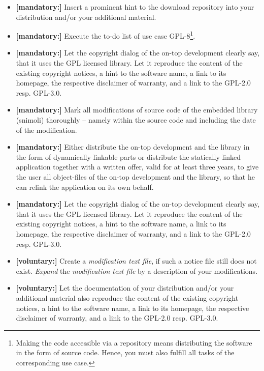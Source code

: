 \begin{description}
\begin{itemize}
  \item \textbf{[mandatory:]} Insert a prominent hint to the download repository
  into your distribution and/or your additional material.
    
  \item \textbf{[mandatory:]} Execute the to-do list of use case GPL-8\footnote{
  Making the code accessible via a repository means distributing the software in
  the form of source code. Hence, you must also fulfill all tasks of the
  corresponding use case.}.

  \item \textbf{[mandatory:]} Let the copyright dialog of the on-top development
  clearly say, that it uses the GPL licensed library. Let it reproduce the
  content of the existing copyright notices, a hint to the software name, a link
  to its homepage, the respective disclaimer of warranty, and a link to the
  GPL-2.0 resp. GPL-3.0.
  
  \item \textbf{[mandatory:]} Mark all modifications of source code of the
  embedded library (snimoli) thoroughly -- namely within the source code and
  including the date of the modification.
    
  \item \textbf{[mandatory:]} Either distribute the on-top development and the
  library in the form of dynamically linkable parts or distribute the statically
  linked application together with a written offer, valid for at least three
  years, to give the user all object-files of the on-top development and the
  library, so that he can relink the application on its own behalf.

  \item \textbf{[mandatory:]} Let the copyright dialog of the on-top development
  clearly say, that it uses the GPL licensed library. Let it reproduce the
  content of the existing copyright notices, a hint to the software name, a link
  to its homepage, the respective disclaimer of warranty, and a link to the
  GPL-2.0 resp. GPL-3.0.  
       
  \item \textbf{[voluntary:]} Create a \emph{modification text file}, if such a
  notice file still does not exist. \emph{Expand} the \emph{modification text
  file} by a description of your modifications.
    
  \item \textbf{[voluntary:]} Let the documentation of your distribution and/or
  your additional material also reproduce the content of the existing copyright
  notices, a hint to the software name, a link to its homepage, the respective
  disclaimer of warranty, and a link to the GPL-2.0 resp.
  GPL-3.0.
  

\end{itemize}
\end{description}
